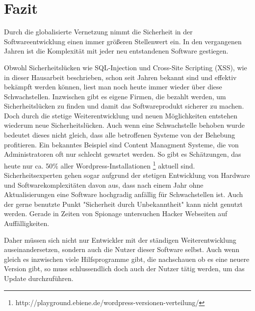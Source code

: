 \section{Fazit}
Durch die globalisierte Vernetzung nimmt die Sicherheit in der 
Softwareentwicklung einen immer größeren Stellenwert ein. In den 
vergangenen Jahren ist die Komplexität mit jeder neu entstandenen 
Software gestiegen. 
\newline


Obwohl Sicherheitslücken wie SQL-Injection und Cross-Site Scripting (XSS), 
wie in dieser Hausarbeit beschrieben, schon seit Jahren bekannt sind und 
effektiv bekämpft werden können, liest man noch heute immer wieder über diese 
Schwachstellen. Inzwischen gibt es eigene Firmen, die bezahlt werden, um 
Sicherheitslücken zu finden und damit das Softwareprodukt sicherer zu 
machen. Doch durch die stetige Weiterentwicklung und neuen Möglichkeiten
entstehen wiederum neue Sicherheitslücken.
Auch wenn eine Schwachstelle behoben wurde bedeutet dieses nicht gleich, 
dass alle betroffenen Systeme von der Behebung profitieren.
Ein bekanntes Beispiel sind Content Managment Systeme, die von
Administratoren oft nur schlecht gewartet werden. So gibt es Schätzungen,
das heute nur ca. 50\% aller Wordpress-Installationen \footnote{http://playground.ebiene.de/wordpress-versionen-verteilung/}
aktuell sind. Sicherheitsexperten gehen sogar aufgrund der stetigen
Entwicklung von Hardware und Softwarekomplexitäten davon aus, dass 
nach einem Jahr ohne Aktualisierungen eine Software hochgradig
anfällig für Schwachstellen ist.
Auch der gerne benutzte Punkt "Sicherheit durch Unbekanntheit" 
kann nicht genutzt werden. Gerade in Zeiten von Spionage untersuchen
Hacker Webseiten auf Auffälligkeiten.
 
Daher müssen sich nicht nur Entwickler mit der ständigen Weiterentwicklung 
auseinandersetzen, sondern auch die Nutzer dieser Software selbst. 
Auch wenn gleich es inzwischen viele Hilfsprogramme gibt, die nachschauen 
ob es eine neuere Version gibt, so muss schlussendlich doch auch der 
Nutzer tätig werden, um das Update durchzuführen.   
